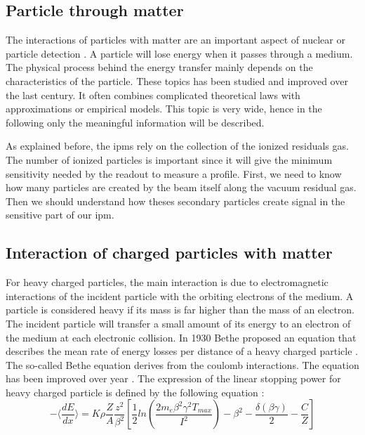 \begin{refsection}
	\section{Particle through matter}
	The interactions of particles with matter are an important aspect of nuclear or particle detection \cite{Knoll2010,Leo1994}. A particle will lose energy when it passes through a medium. The physical process behind the energy transfer mainly depends on the characteristics of the particle. These topics has been studied and improved over the last century. It often combines complicated theoretical laws with approximations or empirical models. This topic is very wide, hence in the following only the meaningful information will be described.

	As explained before, the \acrshort{ipm}s rely on the collection of the ionized residuals gas. The number of ionized particles is important since it will give the minimum sensitivity needed by the readout to measure a profile. First, we need to know how many particles are created by the beam itself along the vacuum residual gas. Then we should understand how theses secondary particles create signal in the sensitive part of our \acrshort{ipm}.


	\subsection{Interaction of charged particles with matter}
	For heavy charged particles, the main interaction is due to electromagnetic interactions of the incident particle with the orbiting electrons of the medium. A particle is considered heavy if its mass is far higher than the mass of an electron. The incident particle will transfer a small amount of its energy to an electron of the medium at each electronic collision. In 1930 Bethe proposed an equation that describes the mean rate of energy losses per distance of a heavy charged particle \cite[]{Bethe1930}. The so-called Bethe equation derives from the coulomb interactions. The equation has been improved over year \cite{Bloch1933,Fermi1940,Fano1963}. The expression of the linear stopping power for heavy charged particle is defined by the following equation \cite[p. 446]{Tanabashi2018}:
	\begin{equation}
		- \bigg \langle \frac{dE}{dx} \bigg \rangle =K \rho \frac{Z}{A} \frac{z^{2}}{\beta^{2}} \left[\frac{1}{2} ln \left(\frac{2 m_{e} \beta^{2} \gamma^{2} T_{max}}{I^{2}} \right) - \beta^{2} - \frac{\delta(\beta \gamma)}{2} - \frac{C}{Z} \right]
	\end{equation}


\end{refsection}
